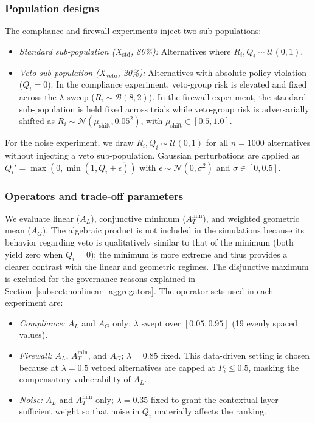 \documentclass[mathematics,article,submit,moreauthors]{Definitions/mdpi}
\begin{document}
\subsubsection{Population designs}
The compliance and firewall experiments inject two sub-populations:
\begin{itemize} 
    \item \emph{Standard sub-population ($X_{\text{std}}$, 80\%):} Alternatives where $R_i, Q_i \sim \mathcal{U}(0,1)$.
    \item \emph{Veto sub-population ($X_{\text{veto}}$, 20\%):} Alternatives with absolute policy violation ($Q_i = 0$). In the compliance experiment, veto-group risk is elevated and fixed across the $\lambda$ sweep ($R_i \sim \mathcal{B}(8,2)$). In the firewall experiment, the standard sub-population is held fixed across trials while veto-group risk is adversarially shifted as $R_i \sim \mathcal{N}(\mu_{\text{shift}}, 0.05^2)$, with $\mu_{\text{shift}} \in [0.5, 1.0]$.
\end{itemize}
For the noise experiment, we draw $R_i, Q_i \sim \mathcal{U}(0,1)$ for all $n = 1000$ alternatives without injecting a veto sub-population. Gaussian perturbations are applied as $Q_i' = \max(0, \min(1, Q_i + \epsilon))$ with $\epsilon \sim \mathcal{N}(0, \sigma^2)$ and $\sigma \in [0, 0.5]$.

\subsubsection{Operators and trade-off parameters}
We evaluate linear ($A_L$), conjunctive minimum ($A_T^{\min}$), and weighted geometric mean ($A_G$). The algebraic product is not included in the simulations because its behavior regarding veto is qualitatively similar to that of the minimum (both yield zero when $Q_i=0$); the minimum is more extreme and thus provides a clearer contrast with the linear and geometric regimes. The disjunctive maximum is excluded for the governance reasons explained in Section~\ref{subsect:nonlinear_aggregators}. The operator sets used in each experiment are:
\begin{itemize}
    \item \emph{Compliance:} $A_L$ and $A_G$ only; $\lambda$ swept over $[0.05, 0.95]$ (19 evenly spaced values).
    \item \emph{Firewall:} $A_L$, $A_T^{\min}$, and $A_G$; $\lambda = 0.85$ fixed. This data-driven setting is chosen because at $\lambda = 0.5$ vetoed alternatives are capped at $P_i \leq 0.5$, masking the compensatory vulnerability of $A_L$.
    \item \emph{Noise:} $A_L$ and $A_T^{\min}$ only; $\lambda = 0.35$ fixed to grant the contextual layer sufficient weight so that noise in $Q_i$ materially affects the ranking.
\end{itemize}
\end{document}
